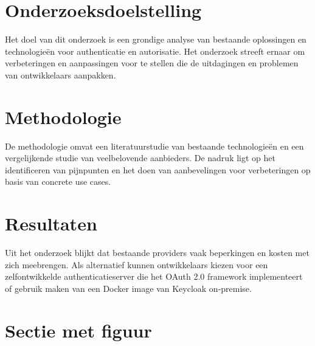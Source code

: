 \documentclass[a0,portrait]{hogent-poster}
\begin{document}
\begin{multicols}{2}
\section{Onderzoeksdoelstelling}

Het doel van dit onderzoek is een grondige analyse van bestaande oplossingen en technologieën voor authenticatie en autorisatie. Het onderzoek
streeft ernaar om verbeteringen en aanpassingen voor te stellen die de uitdagingen en problemen van ontwikkelaars aanpakken.

\section{Methodologie}

De methodologie omvat een literatuurstudie van bestaande technologieën en een vergelijkende studie van veelbelovende aanbieders. De nadruk ligt
op het identificeren van pijnpunten en het doen van aanbevelingen voor verbeteringen op basis van concrete use cases.

\section{Resultaten}

Uit het onderzoek blijkt dat bestaande providers vaak beperkingen en kosten met zich meebrengen. Als alternatief kunnen ontwikkelaars kiezen voor
een zelfontwikkelde authenticatieserver die het OAuth 2.0 framework implementeert of gebruik maken van een Docker image van Keycloak on-premise.
  
\section{Sectie met figuur}


\end{multicols}
\end{document}
